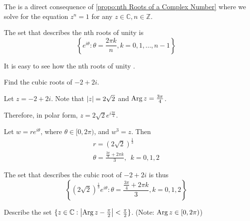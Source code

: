 \documentclass[11pt, oneside]{book}
\begin{document}
\begin{remark}\label{remark:nth Roots of Unity}
	The  is a direct consequence of \cref{propo:nth Roots of a Complex Number} where we solve for the equation $z^n = 1$ for any $z \in \mathbb{C}, n \in \mathbb{Z}$.

	The set that describes the nth roots of unity is
	\begin{equation}\label{eq:nth roots of unity}
		\left\{ e^{i \theta} : \theta = \frac{2 \pi k}{n}, k = 0, 1, ..., n - 1 \right\}
	\end{equation}
\end{remark}

It is easy to see how the nth roots of unity .

\begin{eg}
	Find the cubic roots of $-2 + 2i$.

	Let $z = -2 + 2i$. Note that $\left|z\right| = 2\sqrt{2}$ and $\operatorname{Arg} z = \frac{3 \pi }{4}$.

	Therefore, in polar form, $z = 2 \sqrt{2} e^{i \frac{3\pi}{4} }$.

	Let $w = re^{i \theta}$, where $\theta \in [0, 2\pi)$, and $w^3 = z$. Then
	\begin{gather*}
		r = (2 \sqrt{2})^\frac{1}{3} \\
		\theta = \frac{\frac{3\pi}{4} + 2 \pi k}{3}, \enspace k = 0, 1, 2
	\end{gather*}

	The set that describes the cubic root of $-2 + 2i$ is thus
	\begin{equation*}
		\left\{ (2\sqrt{2})^\frac{1}{3} e^{i \theta} : \theta = \frac{\frac{3\pi}{4} + 2 \pi k}{3}, k = 0, 1, 2 \right\}
	\end{equation*}
\end{eg}

\begin{eg}
	Describe the set $\{z \in \mathbb{C} : \left|\operatorname{Arg} z - \frac{\pi}{2}\right| < \frac{\pi}{2} \}$. (Note: $\operatorname{Arg} z \in [0, 2\pi)$)

	\begin{center}
	\end{center}
\end{eg}
\end{document}
